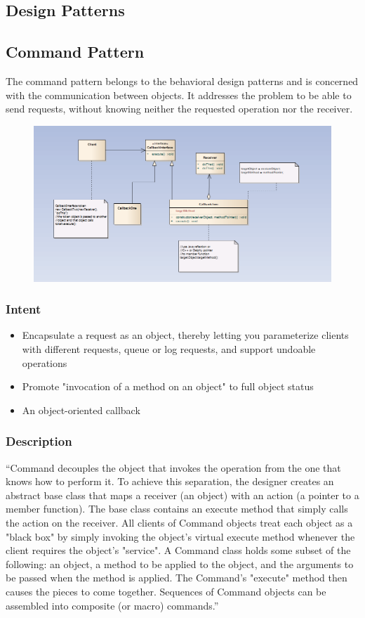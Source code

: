 \subsection{Design Patterns}
\subsection{Command Pattern}
The command pattern belongs to the behavioral design patterns and is concerned with the communication between objects. It addresses the problem to be able to send requests, without knowing neither the requested operation nor the receiver.
\begin{figure}[!hbp]
\includegraphics[scale=0.60]{img/pics/command.PNG}
\caption{ \protect \cite{Shvets}}
\label{fig:ref_command}
\end{figure}
\subsubsection{Intent}
\begin{itemize} 
\item Encapsulate a request as an object, thereby letting you parameterize clients with different requests, queue or log requests, and support undoable operations
\item Promote "invocation of a method on an object" to full object status
\item An object-oriented callback
\end{itemize} 
\citep{Shvets}

\subsubsection{Description}
“Command decouples the object that invokes the operation from the one that knows how to perform it. To achieve this separation, the designer creates an abstract base class that maps a receiver (an object) with an action (a pointer to a member function). The base class contains an execute method that simply calls the action on the receiver. All clients of Command objects treat each object as a "black box" by simply invoking the object's virtual execute method whenever the client requires the object's "service". \vfill A Command class holds some subset of the following: an object, a method to be applied to the object, and the arguments to be passed when the method is applied. The Command's "execute" method then causes the pieces to come together.  Sequences of Command objects can be assembled into composite (or macro) commands.”\citep{Shvets}


